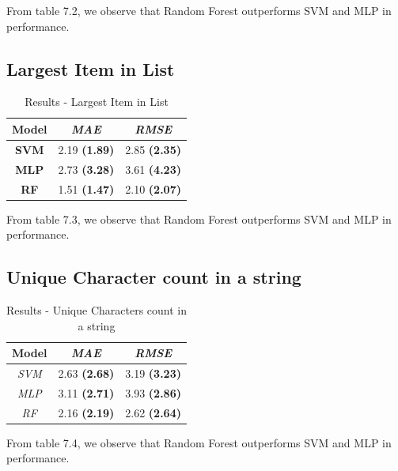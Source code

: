 From table 7.2, we observe that Random Forest outperforms SVM and MLP in performance. 


\subsection{Largest Item in List}

\begin{table}[h]  
\centering
\caption{Results - Largest Item in List}
\begin{tabular}{|c|c|c|}
\hline
\textbf{Model} & \textit{\textbf{MAE}} & \textit{\textbf{RMSE}} \\ \hline
\textbf{SVM}   & 2.19 \textbf{(1.89)}           & 2.85 \textbf{(2.35)}            \\ \hline
\textbf{MLP}   & 2.73 \textbf{(3.28)}           & 3.61 \textbf{(4.23) }           \\ \hline
\textbf{RF}    & 1.51 \textbf{(1.47)}           & 2.10 \textbf{(2.07)}            \\ \hline
\end{tabular}

\label{tab:larg-list}
\end{table}

From table 7.3, we observe that Random Forest outperforms SVM and MLP in performance. 


\subsection{Unique Character count in a string}

\begin{table}[h]
\centering
\caption{Results - Unique Characters count in a string}
\begin{tabular}{|c|c|c|}
\hline
\textbf{Model} & \textit{\textbf{MAE}} & \textit{\textbf{RMSE}} \\ \hline
\textit{SVM} & 2.63 \textbf{(2.68)} & 3.19 \textbf{(3.23)} \\ \hline
\textit{MLP} & 3.11 \textbf{(2.71)} & 3.93 \textbf{(2.86)} \\ \hline
\textit{RF} & 2.16 \textbf{(2.19)} & 2.62 \textbf{(2.64)} \\ \hline
\end{tabular}

\label{tab:unique}
\end{table}

From table 7.4, we observe that Random Forest outperforms SVM and MLP in performance. 

